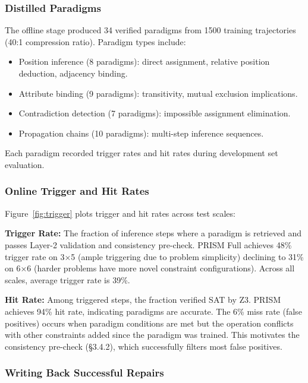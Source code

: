 \subsubsection{Distilled Paradigms}

The offline stage produced 34 verified paradigms from 1500 training trajectories (40:1 compression ratio). Paradigm types include:
\begin{itemize}
    \item Position inference (8 paradigms): direct assignment, relative position deduction, adjacency binding.
    \item Attribute binding (9 paradigms): transitivity, mutual exclusion implications.
    \item Contradiction detection (7 paradigms): impossible assignment elimination.
    \item Propagation chains (10 paradigms): multi-step inference sequences.
\end{itemize}

Each paradigm recorded trigger rates and hit rates during development set evaluation.

\subsubsection{Online Trigger and Hit Rates}

Figure~\ref{fig:trigger} plots trigger and hit rates across test scales:

\textbf{Trigger Rate:} The fraction of inference steps where a paradigm is retrieved and passes Layer-2 validation and consistency pre-check. PRISM Full achieves 48\% trigger rate on 3×5 (ample triggering due to problem simplicity) declining to 31\% on 6×6 (harder problems have more novel constraint configurations). Across all scales, average trigger rate is 39\%.

\textbf{Hit Rate:} Among triggered steps, the fraction verified SAT by Z3. PRISM achieves 94\% hit rate, indicating paradigms are accurate. The 6\% miss rate (false positives) occurs when paradigm conditions are met but the operation conflicts with other constraints added since the paradigm was trained. This motivates the consistency pre-check (§3.4.2), which successfully filters most false positives.

\subsubsection{Writing Back Successful Repairs}

